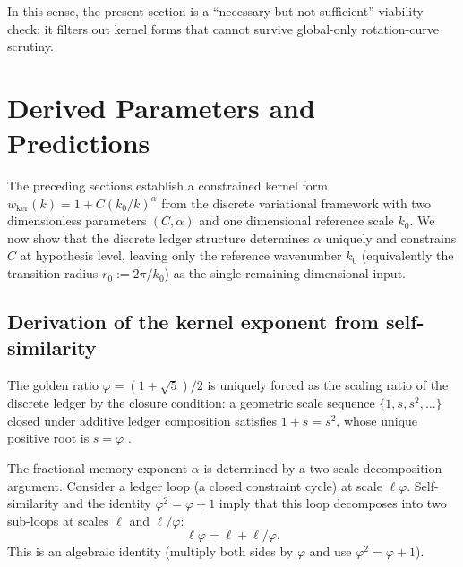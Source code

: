 \documentclass[entropy,article,submit,pdftex,moreauthors]{Definitions/mdpi}
\begin{document}
In this sense, the present section is a “necessary but not sufficient” viability check: it filters out kernel forms that cannot survive global-only rotation-curve scrutiny.


\section{Derived Parameters and Predictions}
\label{sec:derived}

The preceding sections establish a constrained kernel form \(w_{\mathrm{ker}}(k)=1+C(k_0/k)^\alpha\) from the discrete variational framework with two dimensionless parameters \((C,\alpha)\) and one dimensional reference scale \(k_0\). We now show that the discrete ledger structure determines \(\alpha\) uniquely and constrains \(C\) at hypothesis level, leaving only the reference wavenumber \(k_0\) (equivalently the transition radius \(r_0 := 2\pi/k_0\)) as the single remaining dimensional input.

\subsection{Derivation of the kernel exponent from self-similarity}
\label{subsec:alpha_derived}

The golden ratio \(\varphi=(1+\sqrt{5})/2\) is uniquely forced as the scaling ratio of the discrete ledger by the closure condition: a geometric scale sequence \(\{1,s,s^2,\ldots\}\) closed under additive ledger composition satisfies \(1+s=s^2\), whose unique positive root is \(s=\varphi\) \cite{pardoguerra2026,washburn2026ratio}.

The fractional-memory exponent \(\alpha\) is determined by a two-scale decomposition argument. Consider a ledger loop (a closed constraint cycle) at scale \(\ell\varphi\). Self-similarity and the identity \(\varphi^2=\varphi+1\) imply that this loop decomposes into two sub-loops at scales \(\ell\) and \(\ell/\varphi\):
\begin{equation}
  \ell\varphi = \ell + \ell/\varphi.
  \label{eq:two_scale}
\end{equation}
This is an algebraic identity (multiply both sides by \(\varphi\) and use \(\varphi^2=\varphi+1\)).
\end{document}
